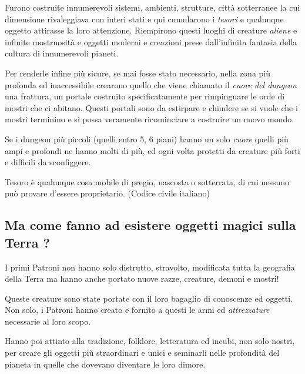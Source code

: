 \begin{multicols}{2}
Furono costruite innumerevoli sistemi, ambienti, strutture, città sotterranee la cui dimensione rivaleggiava con interi stati e qui cumularono i \emph{tesori} e qualunque oggetto attirasse la loro attenzione. Riempirono questi luoghi di creature \emph{aliene} e infinite mostruosità e oggetti moderni e creazioni prese dall'infinita fantasia della cultura di innumerevoli pianeti.

Per renderle infine più sicure, se mai fosse stato necessario, nella zona più profonda ed inaccessibile crearono quello che viene chiamato il \emph{cuore del dungeon} una frattura, un portale costruito specificatamente per rimpinguare le orde di mostri che ci abitano. Questi portali sono da estirpare e chiudere se si vuole che i mostri terminino e si possa veramente ricominciare a costruire un nuovo mondo.

Se i dungeon più piccoli (quelli entro 5, 6 piani) hanno un solo \emph{cuore} quelli più ampi e profondi ne hanno molti di più, ed ogni volta protetti da creature più forti e difficili da sconfiggere.

\medskip

\begin{enfasi}

Tesoro è qualunque cosa mobile di pregio, nascosta o sotterrata, di cui nessuno può provare d'essere proprietario. (Codice civile italiano)

\end{enfasi}

\subsection*{Ma come fanno ad esistere oggetti magici sulla Terra ?}

I primi Patroni non hanno solo distrutto, stravolto, modificata tutta la geografia della Terra ma hanno anche portato nuove razze, creature, demoni e mostri!

Queste creature sono state portate con il loro bagaglio di conoscenze ed oggetti. Non solo, i Patroni hanno creato e fornito a questi le armi ed \emph{attrezzature} necessarie al loro scopo.

Hanno poi attinto alla tradizione, folklore, letteratura ed incubi, non solo nostri, per creare gli oggetti più straordinari e unici e seminarli nelle profondità del pianeta in quelle che dovevano diventare le loro dimore.


\end{multicols}
